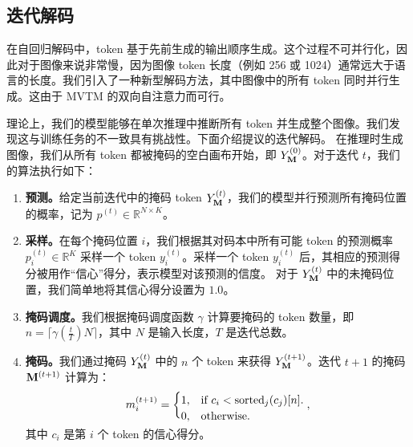 \subsection{迭代解码}
\label{ssec:decoding}
在自回归解码中，token 基于先前生成的输出顺序生成。这个过程不可并行化，因此对于图像来说非常慢，因为图像 token 长度（例如 256 或 1024）通常远大于语言的长度。我们引入了一种新型解码方法，其中图像中的所有 token 同时并行生成。这由于 MVTM 的双向自注意力而可行。

理论上，我们的模型能够在单次推理中推断所有 token 并生成整个图像。我们发现这与训练任务的不一致具有挑战性。下面介绍提议的迭代解码。
在推理时生成图像，我们从所有 token 都被掩码的空白画布开始，即 $Y_{\mathbf{M}}^{(0)}$。对于迭代 $t$，我们的算法执行如下：

 \vspace{-2mm}
 \begin{enumerate}
     \item \textbf{预测。}给定当前迭代中的掩码 token $Y_{\mathbf{M}}^{(t)}$，我们的模型并行预测所有掩码位置的概率，记为 $p^{(t)} \in \mathbb{R}^{N \times K}$。\\ \vspace{-5mm}
     \item \textbf{采样。}在每个掩码位置 $i$，我们根据其对码本中所有可能 token 的预测概率 $p_i^{(t)} \in \mathbb{R}^K$ 采样一个 token $y_i^{(t)}$。采样一个 token $y_i^{(t)}$ 后，其相应的预测得分被用作``信心''得分，表示模型对该预测的信度。
 对于 $Y_{\mathbf{M}}^{(t)}$ 中的未掩码位置，我们简单地将其信心得分设置为 $1.0$。\\ \vspace{-5mm}
    \item \textbf{掩码调度。}我们根据掩码调度函数 $\gamma$ 计算要掩码的 token 数量，即 $n = \lceil \gamma(\frac{t}{T}) N \rceil$，其中 $N$ 是输入长度，$T$ 是迭代总数。
    \item \textbf{掩码。}我们通过掩码 $Y_{\mathbf{M}}^{(t)}$ 中的 $n$ 个 token 来获得 $Y_{\mathbf{M}}^{(t+1)}$。迭代 $t+1$ 的掩码 ${\mathbf{M}}^{(t+1)}$ 计算为：\vspace{-2mm}
        \begin{equation*}
         m_{i}^{(t+1)} = 
        \begin{cases}
            1,  & \text{if $c_i < {\text{sorted}}_j(c_j)[n]$.}\\
            0,  & \text{otherwise.}\vspace{-2mm}
        \end{cases},
        \end{equation*}
    其中 $c_i$ 是第 $i$ 个 token 的信心得分。

 \end{enumerate}


